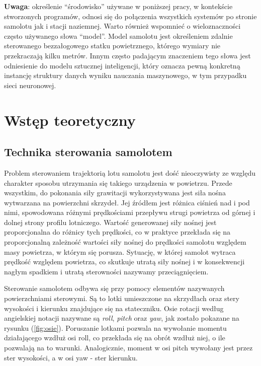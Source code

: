 \documentclass[12pt, a4paper]{article}
\let\oldref\ref
\renewcommand{\ref}[1]{(\oldref{#1})}
\begin{document}
\textbf{Uwaga}: określenie ``środowisko'' używane w poniższej pracy, w kontekście stworzonych programów, odnosi się do połączenia wszystkich systemów po stronie samolotu jak i stacji naziemnej. Warto również wspomnieć o wieloznaczności często używanego słowa ``model''. Model samolotu jest określeniem zdalnie sterowanego bezzałogowego statku powietrznego, którego wymiary nie przekraczają kilku metrów. Innym często padającym znaczeniem tego słowa jest odniesienie do modelu sztucznej inteligencji, który oznacza pewną konkretną instancję struktury danych wyniku nauczania maszynowego, w tym przypadku sieci neuronowej.

\clearpage
\section{Wstęp teoretyczny}

\subsection{Technika sterowania samolotem}
Problem sterowaniem trajektorią lotu samolotu jest dość nieoczywisty ze względu charakter sposobu utrzymania się takiego urządzenia w powietrzu. Przede wszystkim, do pokonania siły grawitacji wykorzystywana jest siła nośna wytwarzana na powierzchni skrzydeł. Jej źródłem jest różnica ciśnień nad i pod nimi, spowodowana różnymi prędkościami przepływu strugi powietrza od górnej i dolnej strony profilu lotniczego. Wartość generowanej siły nośnej jest proporcjonalna do różnicy tych prędkości, co w praktyce przekłada się na proporcjonalną zależność wartości siły nośnej do prędkości samolotu względem masy powietrza, w którym się porusza. Sytuację, w której samolot wytraca prędkość względem powietrza, co skutkuje utratą siły nośnej i w konsekwencji nagłym spadkiem i utratą sterowności nazywamy przeciągnięciem.

Sterowanie samolotem odbywa się przy pomocy elementów nazywanych powierzchniami sterowymi. Są to lotki umieszczone na skrzydłach oraz stery wysokości i kierunku znajdujące się na stateczniku. Osie rotacji według angielskiej notacji nazywane są \textit{roll}, \textit{pitch} oraz \textit{yaw}, jak zostało pokazane na rysunku \ref{fig:osie}. Poruszanie lotkami pozwala na wywołanie momentu działającego wzdłuż osi roll, co przekłada się na obrót wzdłuż niej, o ile pozwalają na to warunki. Analogicznie, moment w osi pitch wywołany jest przez ster wysokości, a w osi yaw - ster kierunku.
\end{document}
